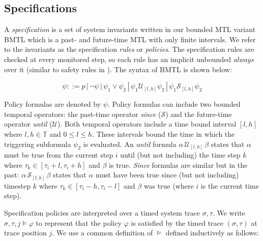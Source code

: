 \subsection{Specifications}
\label{sec:formal:spec}
A \emph{specification} is a set of system invariants written in our bounded MTL variant BMTL which is a past- and future-time MTL with only finite intervals.  
We refer to the invariants as the specification \emph{rules} or \emph{policies}. The specification rules are checked at every monitored step, so each rule has an implicit unbounded \emph{always} over it (similar to safety rules in \cite{Basin2008}). The syntax of BMTL is shown below:

$$\psi ::=  p \, | \,  \neg \psi \, | \,  \psi_1 \vee \psi_2 \, | \,  \psi_1 \mathcal{U}_{[l,h]} \psi_2 \, | \, \psi_1 \mathcal{S}_{[l,h]} \psi_2$$

Policy formulas are denoted by $\psi$. Policy formulas can include two bounded temporal operators: the past-time operator \emph{since} ($\mathcal{S}$) and the future-time operator \emph{until} ($\mathcal{U}$). 
Both temporal operators include a time bound interval $[l,h]$ where $l,h \in \mathbb{T}$ and $0 \leq l \leq h$. 
These intervals bound the time in which the triggering subformula $\psi_2$ is evaluated. 
An \emph{until} formula $\alpha\, \mathcal{U}_{[l,h]}\, \beta$ states that $\alpha$ must be true from the current step $i$ until (but not including) the time step $k$ where $\tau_k \in [\tau_i+l,\tau_i+h]$ and $\beta$ is true. 
\emph{Since} formulas are similar but in the past: $\alpha\, \mathcal{S}_{[l,h]}\, \beta$ states that $\alpha$ must have been true since (but not including) timestep $k$ where  $\tau_k \in [\tau_i-h,\tau_i-l]$ and $\beta$ was true (where $i$ is the current time step).

Specification policies are interpreted over a timed system trace $\sigma,\tau$. 
We write $\sigma, \tau, j \vDash \varphi$ to represent that the policy $\varphi$ is satisfied by the timed trace $(\sigma, \tau)$ at trace position $j$. We use a common definition of $\vDash$ defined inductively as follows:

